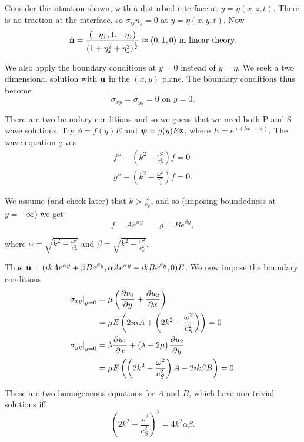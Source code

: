 \documentclass{notes}
\newcommand{\bs}[1]{\boldsymbol{#1}}
\begin{document}
\vspace{1.5in}

Consider the situation shown, with a disturbed interface at
$y = \eta(x,z,t)$.  There is no traction at the interface, so
$\sigma_{ij}n_j = 0$ at $y = \eta(x,y,t)$.  Now
\[
\Hat {\mathbf{n}} = \frac{(-\eta_x,1,-\eta_z)}{\left( 1+ \eta_x^2 + \eta_z^2
\right)^{\frac{1}{2}}} \approx (0,1,0) \text{ in linear theory.}
\]

We also apply the boundary conditions at $y=0$ instead of $y = \eta$.
We seek a two dimensional solution with $\mathbf{u}$ in the $(x,y)$ plane.  The
boundary conditions thus become
\[
\sigma_{xy} = \sigma_{yy} = 0 \text{ on } y = 0.
\]

There are two boundary conditions and so we guess that we need both
P and S wave solutions.  Try $\phi = f(y) E$ and $\bs \psi
= g(y) E \Hat{\vect z}$, where $E = e^{\imath(k x-\omega t)}$.  The
wave equation gives
\begin{gather*}
f'' - \left( k^2 - \frac{\omega^2}{c_P^2} \right) f = 0\\
g'' - \left( k^2 - \frac{\omega^2}{c_S^2} \right) f = 0.
\end{gather*}

We assume (and check later) that $k > \frac{\omega}{c_S}$, and so
(imposing boundedness at $y=-\infty$) we get
\[
f= A e^{\alpha y} \qquad g = B e^{\beta y},
\]

where $\alpha = \sqrt{k^2 - \tfrac{\omega^2}{c_P^2}}$ and
$\beta = \sqrt{k^2 - \tfrac{\omega^2}{c_S^2}}$.

Thus $\mathbf{u} = (\imath k A e^{\alpha y} + \beta B e^{\beta y},
\alpha A e^{\alpha y} - \imath k B e^{\beta y},0) E$.  We now impose the
boundary conditions
\begin{align*}
\left.\sigma_{xy}\right|_{y=0}
&= \mu\left( \frac{\partial u_1}{\partial y} + \frac{\partial u_2}{\partial x} \right) \\
&= \mu E \left( 2 \imath \alpha A + \left( 2 k^2 -
\frac{\omega^2}{c_S^2} \right) \right) = 0 \\
\left.\sigma_{yy}\right|_{y=0}
&= \lambda \frac{\partial u_1}{\partial x} + \left( \lambda + 2 \mu \right)
\frac{\partial u_2}{\partial y} \\
&= \mu E \left( \left(2 k^2 - \frac{\omega^2}{c_S^2} \right) A
- 2 \imath k \beta B\right) = 0.
\end{align*}

These are two homogeneous equations for $A$ and $B$, which have non-trivial
solutions iff
\begin{equation}\label{eq:Rayldisp1}
\left( 2 k^2 - \frac{\omega^2}{c_S^2} \right)^2 = 4 k^2 \alpha \beta.
\end{equation} 
\end{document}
